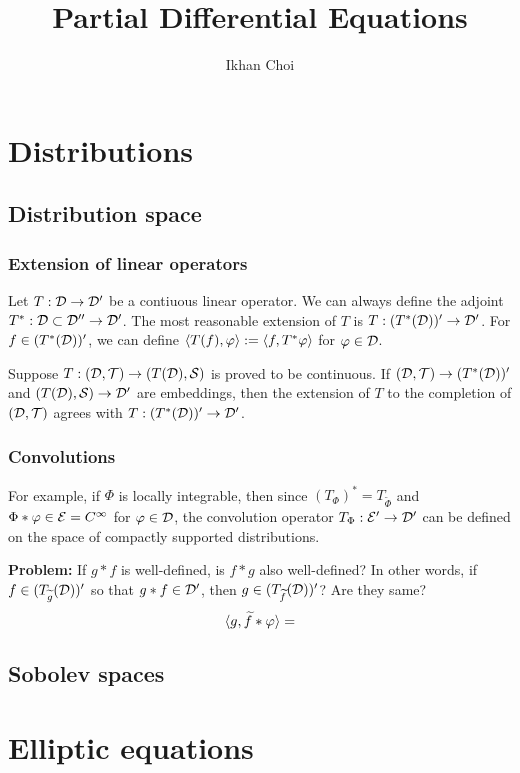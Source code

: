 \documentclass{../note}
\begin{document}
\title{Partial Differential Equations}
\author{Ikhan Choi}
\maketitle
\tableofcontents


\part{Distributions}
\chapter{Distribution space}


\section{Extension of linear operators}
Let $T:\mathcal{D}\to\mathcal{D}'$ be a contiuous linear operator.
We can always define the adjoint $T^*:\mathcal{D}\subset\mathcal{D}''\to\mathcal{D}'$.
The most reasonable extension of $T$ is $T:(T^*(\mathcal{D}))'\to\mathcal{D}'$.
For $f\in(T^*(\mathcal{D}))'$, we can define $\langle T(f),\varphi\rangle:=\langle f,T^*\varphi\rangle$ for $\varphi\in\mathcal{D}$.

Suppose $T:(\mathcal{D},\mathcal{T})\to(T(\mathcal{D}),\mathcal{S})$ is proved to be continuous.
If $(\mathcal{D},\mathcal{T})\to(T^*(\mathcal{D}))'$ and $(T(\mathcal{D}),\mathcal{S})\to\mathcal{D}'$ are embeddings, then the extension of $T$ to the completion of $(\mathcal{D},\mathcal{T})$ agrees with $T:(T^*(\mathcal{D}))'\to\mathcal{D}'$.

\section{Convolutions}
For example, if $\Phi$ is locally integrable, then since $(T_\Phi)^*=T_{\tilde\Phi}$ and $\Phi*\varphi\in\mathcal{E}=C^\infty$ for $\varphi\in\mathcal{D}$, the convolution operator $T_\Phi:\mathcal{E}'\to\mathcal{D}'$ can be defined on the space of compactly supported distributions.

\textbf{Problem:}
If $g*f$ is well-defined, is $f*g$ also well-defined?
In other words, if $f\in(T_{\widetilde g}(\mathcal{D}))'$ so that $g*f\in\mathcal{D}'$, then $g\in(T_{\widetilde f}(\mathcal{D}))'$? Are they same?
\[\langle g,\widetilde f*\varphi\rangle=\]

\chapter{Sobolev spaces}

\part{Elliptic equations}
\end{document}
